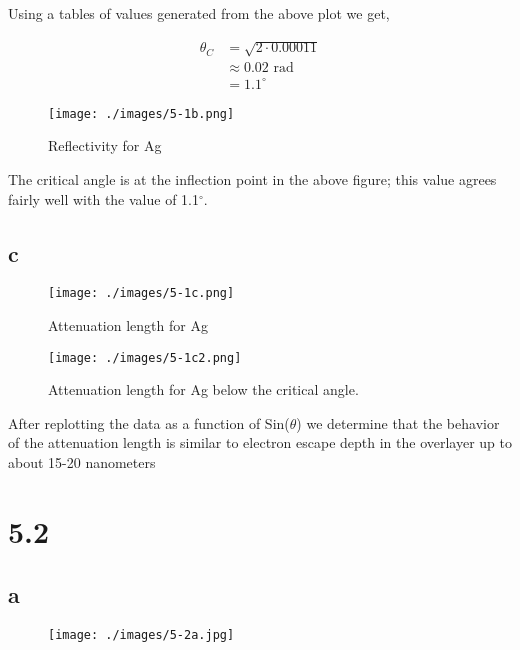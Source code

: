 \documentclass[12pt]{article}
\renewcommand{\=}[1]{\stackrel{#1}{=}} %
\theoremstyle{definition}
\theoremstyle{remark}
\begin{document}
Using a tables of values generated from the above plot we get,

\begin{align*}
\theta_C &= \sqrt{2 \cdot 0.00011}\\[3mm]
	&\approx 0.02 \,\,\text{rad}\\[3mm]
	&= 1.1^\circ
\end{align*}

\begin{figure}[H]
\centering
\texttt{[image: ./images/5-1b.png]}
\caption{Reflectivity for Ag}
\label{5-1b}
\end{figure}

The critical angle is at the inflection point in the above figure; this value agrees fairly well with the value of 1.1$^\circ$.

\subsection*{c}
\begin{figure}[H]
\centering
\texttt{[image: ./images/5-1c.png]}
\caption{Attenuation length for Ag}
\label{5-1c}
\end{figure}

\begin{figure}[H]
\centering
\texttt{[image: ./images/5-1c2.png]}
\caption{Attenuation length for Ag below the critical angle.}
\label{5-1c2}
\end{figure}

After replotting the data as a function of Sin($\theta$) we determine that the behavior of the attenuation length is similar to electron escape depth in the overlayer up to about 15-20 nanometers
\newpage
\section*{5.2}
\subsection*{a}

\begin{figure}[H]
\centering
\texttt{[image: ./images/5-2a.jpg]}
\label{5-2a}
\end{figure}
\end{document}
